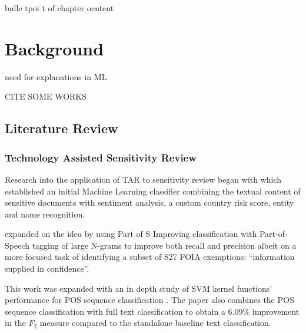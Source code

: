 \documentclass{l4proj}
\begin{document}
bulle tpoi t of chapter ocntent


\chapter{Background}

need for explanations in ML

CITE SOME WORKS

\section{Literature Review}

\subsection{Technology Assisted Sensitivity Review}


Research into the application of TAR to sensitivity review began with \textcite{de_rijke_towards_2014} which established an initial Machine Learning classifier combining the textual content of sensitive documents with sentiment analysis, a custom country risk score, entity and name recognition.

\autocite{sanchezDetectingSensitiveInformation2012}

\textcite{mcdonaldUsingPartofSpeechNgrams2015} expanded on the idea by using Part of S Improving classification with Part-of-Speech tagging of large N-grams to improve both recall and precision albeit on a more focused task of identifying a subset of S27 FOIA exemptions: ``information supplied in confidence''.

This work was expanded with an in depth study of SVM kernel functions' performance for POS sequence classification \autocite{mcdonaldStudySVMKernel2017}.
The paper also combines the POS sequence classification with full text classification to obtain a 6.09\% improvement in the $F_{2}$ measure compared to the standalone baseline text classification.
\end{document}
